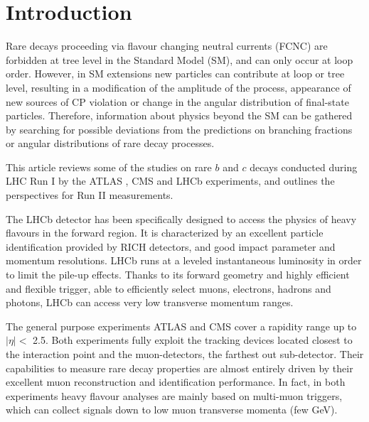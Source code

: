 %
%
%
\section{Introduction}
\label{intro}
Rare decays proceeding via flavour changing neutral currents (FCNC) are forbidden at tree level in the Standard Model (SM), and can only occur at loop order.
However, in SM extensions new particles can contribute at loop or tree level, resulting in a modification of the amplitude of the process, appearance of new sources of CP violation or change in the angular distribution of final-state particles.
Therefore, information about physics beyond the SM can be gathered by searching for possible deviations from the predictions on branching fractions or angular distributions of rare decay processes.

This article reviews some of the studies on rare $b$ and $c$ decays conducted during LHC Run I by the ATLAS \cite{ATLAS}, CMS \cite{CMS} and LHCb \cite{LHCb} 
experiments, and outlines the perspectives for Run II measurements.

The LHCb detector has been specifically designed to access the physics of heavy flavours in the forward region.
It is characterized by an excellent particle identification provided by RICH detectors, and good impact parameter and momentum resolutions.
LHCb runs at a leveled instantaneous luminosity in order to limit the pile-up effects.
Thanks to its forward geometry and highly efficient and flexible trigger, able to efficiently select muons, electrons, hadrons and photons, LHCb can access very low transverse momentum ranges.

The general purpose experiments ATLAS and CMS cover a rapidity range up to $|\eta | <$ 2.5.
Both experiments fully exploit the tracking devices located closest to the interaction point and the muon-detectors, the farthest out sub-detector. 
Their capabilities to measure rare decay properties are almost entirely driven by their excellent muon reconstruction and identification performance. In fact, in both experiments heavy flavour analyses are mainly based on multi-muon triggers, which can collect signals down to low muon transverse momenta (few GeV).

